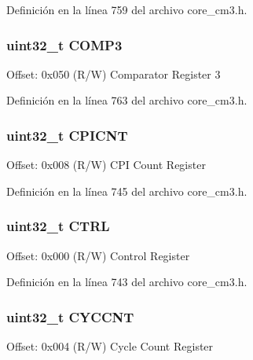 Definición en la línea 759 del archivo core\+\_\+cm3.\+h.

\subsubsection[{\texorpdfstring{C\+O\+M\+P3}{COMP3}}]{ uint32\+\_\+t C\+O\+M\+P3}\hypertarget{struct_d_w_t___type_a923d50abd92dbc50ef2983770489eafd}{}\label{struct_d_w_t___type_a923d50abd92dbc50ef2983770489eafd}
Offset\+: 0x050 (R/W) Comparator Register 3 

Definición en la línea 763 del archivo core\+\_\+cm3.\+h.

\subsubsection[{\texorpdfstring{C\+P\+I\+C\+NT}{CPICNT}}]{ uint32\+\_\+t C\+P\+I\+C\+NT}\hypertarget{struct_d_w_t___type_a49a1dced8d644fa6f4128570f102212e}{}\label{struct_d_w_t___type_a49a1dced8d644fa6f4128570f102212e}
Offset\+: 0x008 (R/W) C\+PI Count Register 

Definición en la línea 745 del archivo core\+\_\+cm3.\+h.

\subsubsection[{\texorpdfstring{C\+T\+RL}{CTRL}}]{ uint32\+\_\+t C\+T\+RL}\hypertarget{struct_d_w_t___type_a15fc8d35f045f329b80c544bef35ff64}{}\label{struct_d_w_t___type_a15fc8d35f045f329b80c544bef35ff64}
Offset\+: 0x000 (R/W) Control Register 

Definición en la línea 743 del archivo core\+\_\+cm3.\+h.

\subsubsection[{\texorpdfstring{C\+Y\+C\+C\+NT}{CYCCNT}}]{ uint32\+\_\+t C\+Y\+C\+C\+NT}\hypertarget{struct_d_w_t___type_acf6d1c3e5f5cef92986fd9cfae5c7224}{}\label{struct_d_w_t___type_acf6d1c3e5f5cef92986fd9cfae5c7224}
Offset\+: 0x004 (R/W) Cycle Count Register 

